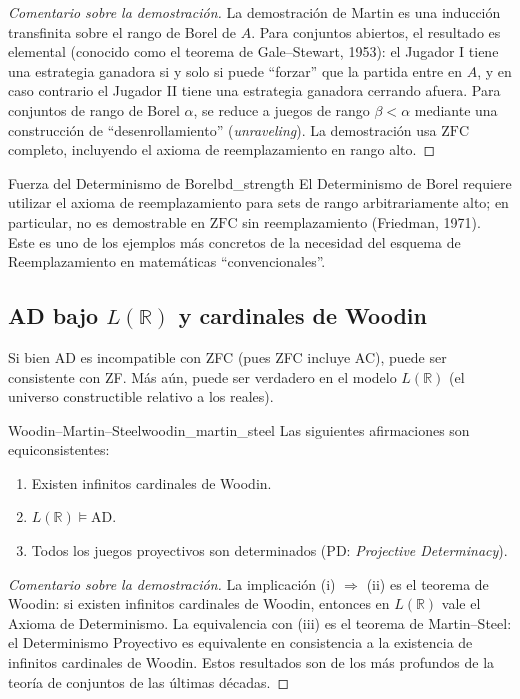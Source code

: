 \begin{proof}[Comentario sobre la demostración]
La demostración de Martin es una inducción transfinita sobre el rango de Borel de $A$. Para conjuntos abiertos, el resultado es elemental (conocido como el teorema de Gale--Stewart, 1953): el Jugador I tiene una estrategia ganadora si y solo si puede ``forzar'' que la partida entre en $A$, y en caso contrario el Jugador II tiene una estrategia ganadora cerrando afuera. Para conjuntos de rango de Borel $\alpha$, se reduce a juegos de rango $\beta < \alpha$ mediante una construcción de ``desenrollamiento'' (\textit{unraveling}). La demostración usa $\mathrm{ZFC}$ completo, incluyendo el axioma de reemplazamiento en rango alto.
\end{proof}

\begin{observacion}{Fuerza del Determinismo de Borel}{bd_strength}
El Determinismo de Borel requiere utilizar el axioma de reemplazamiento para sets de rango arbitrariamente alto; en particular, no es demostrable en $\mathrm{ZFC}$ sin reemplazamiento (Friedman, 1971). Este es uno de los ejemplos más concretos de la necesidad del esquema de Reemplazamiento en matemáticas ``convencionales''.
\end{observacion}

\subsection{AD bajo $L(\mathbb{R})$ y cardinales de Woodin}

Si bien AD es incompatible con ZFC (pues ZFC incluye AC), puede ser consistente con ZF. Más aún, puede ser verdadero en el modelo $L(\mathbb{R})$ (el universo constructible relativo a los reales).

\begin{teorema}{Woodin--Martin--Steel}{woodin_martin_steel}
Las siguientes afirmaciones son equiconsistentes:
\begin{enumerate}[leftmargin=2em, label=(\roman*)]
  \item Existen infinitos cardinales de Woodin.
  \item $L(\mathbb{R}) \models \mathrm{AD}$.
  \item Todos los juegos proyectivos son determinados ($\mathrm{PD}$: \textit{Projective Determinacy}).
\end{enumerate}
\end{teorema}

\begin{proof}[Comentario sobre la demostración]
La implicación (i) $\Rightarrow$ (ii) es el teorema de Woodin: si existen infinitos cardinales de Woodin, entonces en $L(\mathbb{R})$ vale el Axioma de Determinismo. La equivalencia con (iii) es el teorema de Martin--Steel: el Determinismo Proyectivo es equivalente en consistencia a la existencia de infinitos cardinales de Woodin. Estos resultados son de los más profundos de la teoría de conjuntos de las últimas décadas.
\end{proof}

